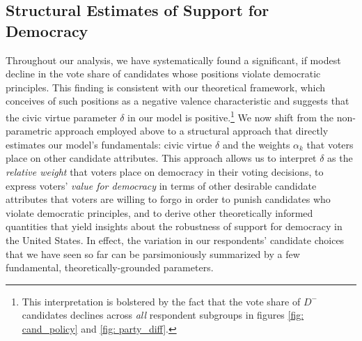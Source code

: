 \documentclass[letterpaper, 12pt]{article}
\begin{document}
\begin{raggedright}
\clearpage

\section{Structural Estimates of Support for Democracy}
\label{sec: logit}

Throughout our analysis, we have systematically found a significant, if modest decline in the vote share of candidates whose positions violate democratic principles. This finding is consistent with our theoretical framework, which conceives of such positions as a negative valence characteristic and suggests that the civic virtue parameter $\delta$ in our model is positive.\footnote{This interpretation is bolstered by the fact that the vote share of $ D^- $ candidates declines across \emph{all} respondent subgroups in figures \ref{fig: cand_policy} and \ref{fig: party_diff}.} We now shift from the non-parametric approach employed above to a structural approach that directly estimates our model's fundamentals: civic virtue $\delta$ and the weights $\alpha_k$ that voters place on other candidate attributes. This approach allows us to interpret $\delta$ as the \emph{relative weight} that voters place on democracy in their voting decisions, to express voters' \emph{value for democracy} in terms of other desirable candidate attributes that voters are willing to forgo in order to punish candidates who violate democratic principles, and to derive other theoretically informed quantities that yield insights about the robustness of support for democracy in the United States. In effect, the variation in our respondents' candidate choices that we have seen so far can be parsimoniously summarized by a few fundamental, theoretically-grounded parameters.


\end{raggedright}
\end{document}
